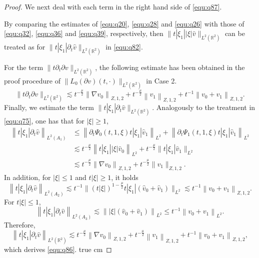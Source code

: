 \documentclass[11pt,twoside]{article}
\newcommand{\R}{\mathbb R}
\newcommand{\p}{\partial}
\newcommand{\f}{\frac}
\theoremstyle{plain}
\theoremstyle{definition}
\theoremstyle{remark}
\numberwithin{equation}{section}
\begin{document}
\begin{proof}
We next deal with each term in the right hand side of \eqref{equ:q87}.

By comparing the estimates of \eqref{equ:q20}, \eqref{equ:q28} and \eqref{equ:q26} with those of \eqref{equ:q32},
\eqref{equ:q36} and \eqref{equ:q39}, respectively, then $\|t|\xi_1||\xi|\hat{v}\|_{L^2(\R^2)}$ can be treated
as for $\|t|\xi_1|\p_t\hat{v}\|_{L^2(\R^2)}$ in \eqref{equ:q82}.

For the term $\|t\p_t\p v\|_{L^2(\R^2)}$, the following estimate has been obtained in the  proof procedure of
$\|L_0(\p v)(t, \cdot)\|_{L^2(\R^2)}$ in Case 2.
$$
\|t\p_t\p v\|_{L^2(\R^2)}\lesssim t^{-\f{\mu}{2}}\left\|\nabla v_0\right\|_{Z, 1, 2}+t^{-\f{\mu}{2}}\left\|v_1\right\|_{Z, 1,2}+t^{-1}\left\|v_0+v_1\right\|_{Z, 1, 2}.
$$
Finally, we estimate the term $\|t|\xi_1|\p_t\hat{v}\|_{L^2(\R^2)}$. Analogously to the treatment in \eqref{equ:q75},
one has that for $|\xi|\geq 1$,
\begin{equation}\label{equ:q88}
\begin{aligned}
\left\|t|\xi_1|\p_t\hat{v}\right\|_{L^2(A_1)} & \leq\left\|\p_t\Psi_{0 }(t, 1, \xi)t|\xi_1|\hat{v}_{1}\right\|_{L^{2}}+\left\|\p_t\Psi_{1 }(t, 1, \xi)t|\xi_1|\hat{v}_{1}\right\|_{L^{2}} \\
& \lesssim t^{-\frac{\mu}{2}}\left\|t|\xi_1||\xi| \hat{v}_{0}\right\|_{L^2}+t^{-\f{\mu}{2}} \|t|\xi_1|\hat{v}_{1}\|_{L^{2}}\\
& \lesssim t^{-\frac{\mu}{2}}\left\|\nabla v_{0}\right\|_{Z, 1, 2}+t^{-\f{\mu}{2}} \|v_{1}\|_{Z, 1, 2}.
\end{aligned}
\end{equation}
In addition, for $|\xi|\leq1$ and $t|\xi|\geq1$, it holds
\begin{equation}\label{equ:q89}
\left\|t|\xi_1|\p_t\hat{v}\right\|_{L^2(A_2)}
\lesssim t^{-1} \big\|(t|\xi|)^{1-\f{\mu}{2}}t|\xi_1|(\hat{v}_{0}+\hat{v}_{1})\big\|_{L^{2}} \lesssim t^{-1}\left\|v_0+v_1\right\|_{Z, 1, 2}.
\end{equation}
For $t|\xi|\leq1$,
$$
\left\|t|\xi_1|\p_t\hat{v}\right\|_{L^2(A_3)} \lesssim \left\||\xi|(\hat{v}_{0}+\hat{v}_{1})\right\|_{L^{2}}  \leq t^{-1}\left\|v_{0}+v_{1}\right\|_{L^{2}}.
$$
Therefore,
\begin{equation}\label{equ:q90}
\left\|t|\xi_1|\p_t\hat{v}\right\|_{L^2(\R^2)}\lesssim t^{-\f{\mu}{2}}\left\|\nabla v_0\right\|_{Z, 1, 2}
+t^{-\f{\mu}{2}}\left\| v_1\right\|_{Z, 1, 2}+t^{-1}\left\|v_0+v_1\right\|_{Z, 1, 2},
\end{equation}
which derives \eqref{equ:q86}.
 true cm


\end{proof}
\end{document}
